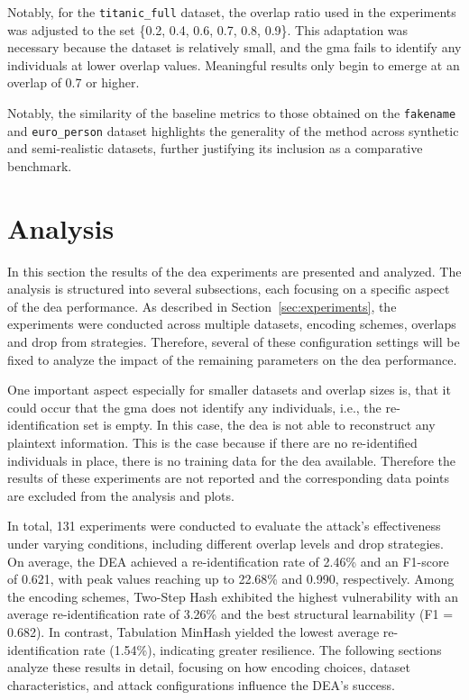 Notably, for the \texttt{titanic\_full} dataset, the overlap ratio used in the experiments was adjusted to the set \{0.2, 0.4, 0.6, 0.7, 0.8, 0.9\}.
This adaptation was necessary because the dataset is relatively small, and the \ac{gma} fails to identify any individuals at lower overlap values.
Meaningful results only begin to emerge at an overlap of 0.7 or higher.

Notably, the similarity of the baseline metrics to those obtained on the \texttt{fakename} and \texttt{euro\_person} dataset highlights the generality of the method across synthetic and semi-realistic datasets, further justifying its inclusion as a comparative benchmark.

\section{Analysis}  \label{sec:analysis}

In this section the results of the \ac{dea} experiments are presented and analyzed.
The analysis is structured into several subsections, each focusing on a specific aspect of the \ac{dea} performance.
As described in Section~\ref{sec:experiments}, the experiments were conducted across multiple datasets, encoding schemes, overlaps and drop from strategies.
Therefore, several of these configuration settings will be fixed to analyze the impact of the remaining parameters on the \ac{dea} performance.

One important aspect especially for smaller datasets and overlap sizes is, that it could occur that the \ac{gma} does not identify any individuals, i.e., the re-identification set is empty.
In this case, the \ac{dea} is not able to reconstruct any plaintext information.
This is the case because if there are no re-identified individuals in place, there is no training data for the \ac{dea} available.
Therefore the results of these experiments are not reported and the corresponding data points are excluded from the analysis and plots.

In total, 131 experiments were conducted to evaluate the attack's effectiveness under varying conditions, including different overlap levels and drop strategies.
On average, the DEA achieved a re-identification rate of 2.46\% and an F1-score of 0.621, with peak values reaching up to 22.68\% and 0.990, respectively.
Among the encoding schemes, Two-Step Hash exhibited the highest vulnerability with an average re-identification rate of 3.26\% and the best structural learnability (F1 = 0.682).
In contrast, Tabulation MinHash yielded the lowest average re-identification rate (1.54\%), indicating greater resilience.
The following sections analyze these results in detail, focusing on how encoding choices, dataset characteristics, and attack configurations influence the DEA's success.


